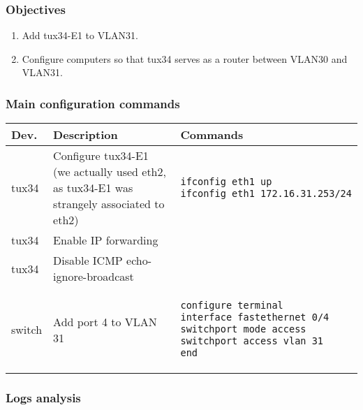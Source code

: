 \documentclass[a4paper, 11pt]{report}
\begin{document}
\subsubsection{Objectives} \label{sec:Obj3}

\begin{enumerate}
    \item Add tux34-E1 to VLAN31.
    \item Configure computers so that tux34 serves as a router between VLAN30 and VLAN31.
\end{enumerate}

\subsubsection{Main configuration commands} \label{sec:Com3}

\begin{tabular}{l | p{75mm} | l}
    \textbf{Dev.} & \textbf{Description}                                  & \textbf{Commands}                       \\ \hline
    tux34         & Configure tux34-E1 (we actually used eth2, as tux34-E1 was strangely associated to eth2) &
        \begin{lstlisting}[frame=none, numbers=none, language=sh]
ifconfig eth1 up
ifconfig eth1 172.16.31.253/24
        \end{lstlisting} \\
    tux34         & Enable IP forwarding & \\
    tux34         & Disable ICMP echo-ignore-broadcast & \\ \hline
    switch        & Add port 4 to VLAN 31 & 
    \begin{lstlisting}[frame=none, numbers=none, language=sh]
configure terminal
interface fastethernet 0/4
switchport mode access
switchport access vlan 31
end
    \end{lstlisting}
\end{tabular}

\subsubsection{Logs analysis} \label{sec:Log3}
\end{document}
